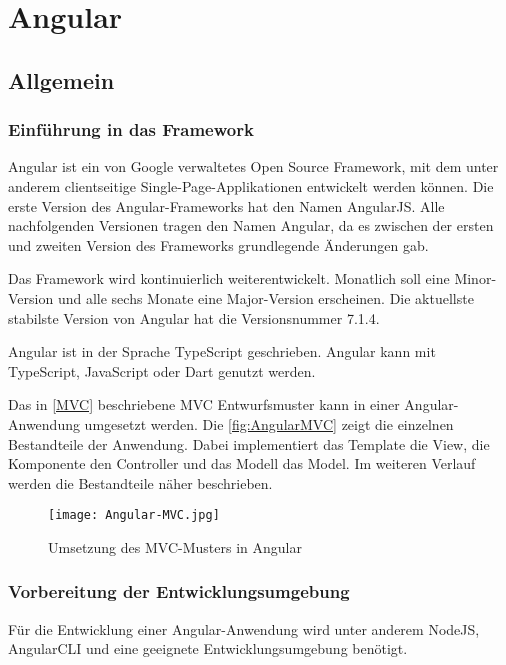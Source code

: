 
\chapter{Angular}
\label{ch:angular}

\section{Allgemein}

\subsection{Einführung in das Framework}\label{sec:aEinf}

Angular ist ein von Google verwaltetes Open Source Framework, mit dem unter anderem clientseitige Single-Page-Applikationen entwickelt werden können. Die erste Version des Angular-Frameworks hat den Namen AngularJS. Alle nachfolgenden Versionen tragen den Namen Angular, da es zwischen der ersten und zweiten Version des Frameworks grundlegende Änderungen gab. 

Das Framework wird kontinuierlich weiterentwickelt. Monatlich soll eine Minor-Version und alle sechs Monate eine Major-Version erscheinen. Die aktuellste stabilste Version von Angular hat die Versionsnummer 7.1.4. \autocites[vgl.][vii\psqq]{Woiwode.2018}[vgl.][3\psqq]{Freeman.2018}

Angular ist in der Sprache TypeScript geschrieben. Angular kann mit TypeScript, JavaScript oder Dart genutzt werden. \autocites[vgl.][vii\psq]{Woiwode.2018}[vgl.][13]{Steyer.2017}

Das in \autoref{MVC} beschriebene MVC Entwurfsmuster kann in einer Angular-Anwendung umgesetzt werden. Die \autoref{fig:AngularMVC} zeigt die einzelnen Bestandteile der Anwendung. Dabei implementiert das Template die View, die Komponente den Controller und das Modell das Model. \autocite[vgl.][34\psqq]{Freeman.2018} Im weiteren Verlauf werden die Bestandteile näher beschrieben. 

\begin{figure}[h]
	\centering
	\texttt{[image: Angular-MVC.jpg]}
	\caption{Umsetzung des MVC-Musters in Angular} 
	\label{fig:AngularMVC}
\end{figure}


\subsection{Vorbereitung der Entwicklungsumgebung}\label{sec:aEntw}
Für die Entwicklung einer Angular-Anwendung wird unter anderem NodeJS, AngularCLI und eine geeignete Entwicklungsumgebung benötigt.  

